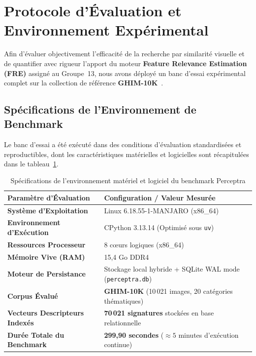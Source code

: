 \section{Protocole d'Évaluation et Environnement Expérimental}

Afin d'évaluer objectivement l'efficacité de la recherche par similarité visuelle et de quantifier avec rigueur l'apport du moteur \textbf{Feature Relevance Estimation (FRE)} assigné au Groupe~13, nous avons déployé un banc d'essai expérimental complet sur la collection de référence \textbf{GHIM-10K}~\cite{kaggle_ghim10k}.

\subsection{Spécifications de l'Environnement de Benchmark}
Le banc d'essai a été exécuté dans des conditions d'évaluation standardisées et reproductibles, dont les caractéristiques matérielles et logicielles sont récapitulées dans le tableau~\ref{tab:specs_eval}.

\begin{table}[H]
\centering
{}
\begin{tabularx}{\textwidth}{>{\bfseries}p{5.5cm}X}
\toprule
\rowcolor{TableHeader}
\color{white}Paramètre d'Évaluation & \color{white}Configuration / Valeur Mesurée \\
\midrule
Système d'Exploitation & Linux 6.18.55-1-MANJARO (x86\_64) \\
Environnement d'Exécution & CPython 3.13.14 (Optimisé sous \texttt{uv}) \\
Ressources Processeur & 8 c\oe{}urs logiques (x86\_64) \\
Mémoire Vive (RAM) & 15,4 Go DDR4 \\
Moteur de Persistance & Stockage local hybride + SQLite WAL mode (\texttt{perceptra.db}) \\
Corpus Évalué & \textbf{GHIM-10K} (10\,021 images, 20 catégories thématiques) \\
Vecteurs Descripteurs Indexés & \textbf{70\,021 signatures} stockées en base relationnelle \\
Durée Totale du Benchmark & \textbf{299,90 secondes} ($\approx 5$ minutes d'exécution continue) \\
\bottomrule
\end{tabularx}
\caption{Spécifications de l'environnement matériel et logiciel du benchmark Perceptra}
\label{tab:specs_eval}
\end{table}

